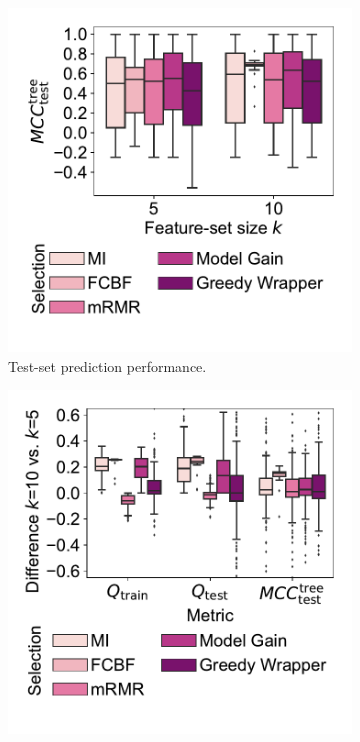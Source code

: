 \documentclass{article}
\theoremstyle{definition}
\begin{document}
\begin{figure}[htb]
	\centering
	\begin{subfigure}[t]{0.48\textwidth}
		\centering
		\includegraphics[width=\textwidth, trim=15 40 15 15, clip]{plots/afs-impact-fs-method-k-decision-tree-test-mcc.pdf}
		\caption{Test-set prediction performance.}
		\label{fig:afs:impact-fs-method-k-decision-tree-test-mcc}
	\end{subfigure}
	\hfill
	\begin{subfigure}[t]{0.48\textwidth}
		\centering
		\includegraphics[width=\textwidth, trim=15 40 15 15, clip]{plots/afs-impact-fs-method-k-metric-diff.pdf}

\end{subfigure}
\end{figure}
\end{document}
